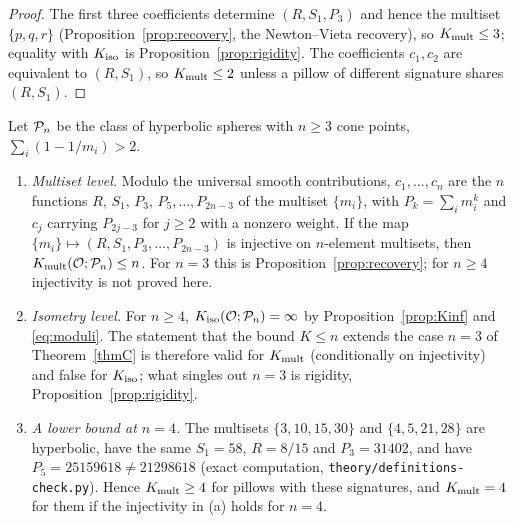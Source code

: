 \begin{proof}
The first three coefficients determine $(R,S_1,P_3)$ and hence the multiset $\{p,q,r\}$
(Proposition~\ref{prop:recovery}, the Newton--Vieta recovery), so $K_{\mathrm{mult}}\le3$; equality with
$K_{\mathrm{iso}}$ is Proposition~\ref{prop:rigidity}. The coefficients $c_1,c_2$ are equivalent to
$(R,S_1)$, so $K_{\mathrm{mult}}\le2$ unless a pillow of different signature shares $(R,S_1)$.
\end{proof}

\begin{remark}\label{rem:nconerestated}
Let $\mathcal{P}_n$ be the class of hyperbolic spheres with $n\ge3$ cone points, $\sum_i(1-1/m_i)>2$.
\begin{enumerate}[label=(\alph*)]
\item \emph{Multiset level.} Modulo the universal smooth contributions, $c_1,\dots,c_n$ are the $n$
  functions $R,\,S_1,\,P_3,\,P_5,\dots,P_{2n-3}$ of the multiset $\{m_i\}$, with $P_k=\sum_im_i^k$ and
  $c_j$ carrying $P_{2j-3}$ for $j\ge2$ with a nonzero weight. If the map
  $\{m_i\}\mapsto(R,S_1,P_3,\dots,P_{2n-3})$ is injective on $n$-element multisets, then
  $K_{\mathrm{mult}}(\mathcal{O};\mathcal{P}_n)\le n$. For $n=3$ this is Proposition~\ref{prop:recovery}; for $n\ge4$ injectivity is not
  proved here.
\item \emph{Isometry level.} For $n\ge4$, $K_{\mathrm{iso}}(\mathcal{O};\mathcal{P}_n)=\infty$ by
  Proposition~\ref{prop:Kinf} and \eqref{eq:moduli}. The statement that the bound $K\le n$ extends
  the case $n=3$ of Theorem~\ref{thmC} is therefore valid for $K_{\mathrm{mult}}$ (conditionally on injectivity) and
  false for $K_{\mathrm{iso}}$; what singles out $n=3$ is rigidity, Proposition~\ref{prop:rigidity}.
\item \emph{A lower bound at $n=4$.} The multisets $\{3,10,15,30\}$ and $\{4,5,21,28\}$ are
  hyperbolic, have the same $S_1=58$, $R=8/15$ and $P_3=31402$, and have $P_5=25159618\ne21298618$
  (exact computation, \texttt{theory/definitions-check.py}). Hence $K_{\mathrm{mult}}\ge4$ for pillows with
  these signatures, and $K_{\mathrm{mult}}=4$ for them if the injectivity in (a) holds for $n=4$.
\end{enumerate}
\end{remark}

